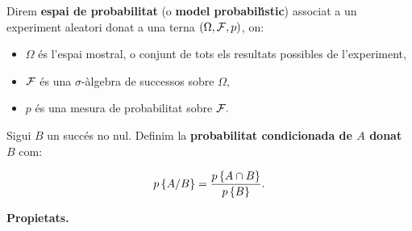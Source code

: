 \begin{defin}
Direm {\bf espai de probabilitat} (o {\bf model
probabil\'{\i}stic}) associat a un
experiment aleatori donat a una terna $(\Omega, {\cal F}, p)$, on:

\begin{itemize}

\item $\Omega$ \'es l'espai mostral, o conjunt de tots els
resultats possibles de l'experiment,

\item ${\cal F}$ \'es una $\sigma$-\`algebra de successos sobre $\Omega,$

\item $p$ \'es una mesura de probabilitat sobre ${\cal F}.$

\end{itemize}
\end{defin}

\begin{defin}
Sigui $B$ un succ\'es no nul. Definim la {\bf probabilitat condicionada de
$A$ donat $B$} com:

$$p\left\{A/B\right\} = {p\left\{A \cap B\right\} \over p\left\{B\right\}}.$$
\end{defin}

{\bf Propietats.}

